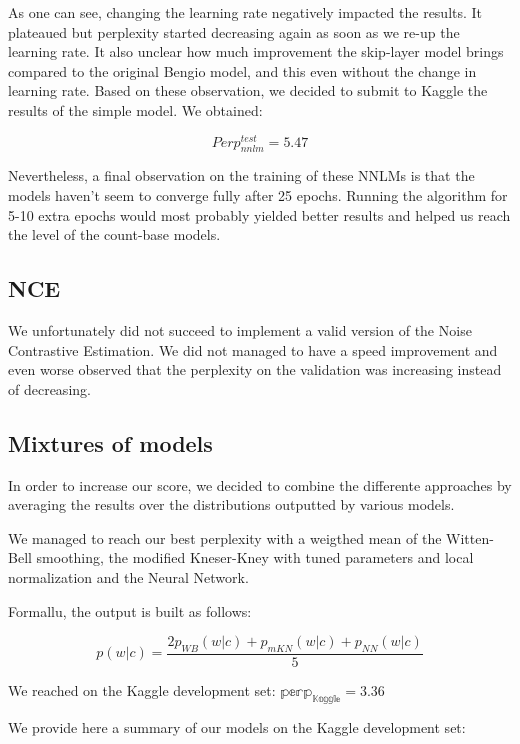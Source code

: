 \documentclass[11pt]{article}
\begin{document}
\noindent As one can see, changing the learning rate negatively impacted the results. It plateaued but perplexity started decreasing again as soon as we re-up the learning rate. It also unclear how much improvement the skip-layer model brings compared to the original Bengio model, and this even without the change in learning rate. Based on these observation, we decided to submit to Kaggle the results of the simple model. We obtained:

$$Perp^{test}_{nnlm} = 5.47$$

\noindent Nevertheless, a final observation on the training of these NNLMs is that the models haven't seem to converge fully after 25 epochs. Running the algorithm for 5-10 extra epochs would most probably yielded better results and helped us reach the level of the count-base models.

\subsection{NCE}

We unfortunately did not succeed to implement a valid version of the Noise Contrastive Estimation. We did not managed to have a speed improvement and even worse observed that the perplexity on the validation was increasing instead of decreasing.

\subsection{Mixtures of models}
In order to increase our score, we decided to combine the differente approaches by averaging the results over the distributions outputted by various models.

We managed to reach our best perplexity with a weigthed mean of the Witten-Bell smoothing, the modified Kneser-Kney with tuned parameters and local normalization and the Neural Network.

Formallu, the output is built as follows:

\[
p(w|c) = \frac{2p_{WB}(w|c) + p_{mKN}(w|c) + p_{NN}(w|c)}{5}
\]

We reached on the Kaggle development set: $ \mathbb{perp_{Kaggle} = 3.36}$

We provide here a summary of our models on the Kaggle development set:
\end{document}

